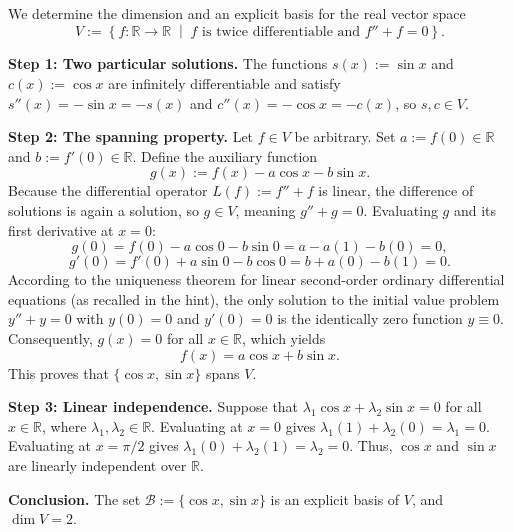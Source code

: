 \begin{exercisesolution*}
\label{sol:harmonic_ode_solution_space}
We determine the dimension and an explicit basis for the real vector space
\[
    V := \left\{ f \colon \mathbb{R} \to \mathbb{R} \;\middle|\; f \text{ is twice differentiable and } f'' + f = 0 \right\}.
\]

\textbf{Step 1: Two particular solutions.} The functions $s(x) := \sin x$ and $c(x) := \cos x$ are infinitely differentiable and satisfy $s''(x) = -\sin x = -s(x)$ and $c''(x) = -\cos x = -c(x)$, so $s, c \in V$.

\textbf{Step 2: The spanning property.} Let $f \in V$ be arbitrary. Set $a := f(0) \in \mathbb{R}$ and $b := f'(0) \in \mathbb{R}$. Define the auxiliary function
\[
    g(x) := f(x) - a \cos x - b \sin x.
\]
Because the differential operator $L(f) := f'' + f$ is linear, the difference of solutions is again a solution, so $g \in V$, meaning $g'' + g = 0$. Evaluating $g$ and its first derivative at $x = 0$:
\[
    g(0) = f(0) - a \cos 0 - b \sin 0 = a - a(1) - b(0) = 0,
\]
\[
    g'(0) = f'(0) + a \sin 0 - b \cos 0 = b + a(0) - b(1) = 0.
\]
According to the uniqueness theorem for linear second-order ordinary differential equations (as recalled in the hint), the only solution to the initial value problem $y'' + y = 0$ with $y(0) = 0$ and $y'(0) = 0$ is the identically zero function $y \equiv 0$.
Consequently, $g(x) = 0$ for all $x \in \mathbb{R}$, which yields
\[
    f(x) = a \cos x + b \sin x.
\]
This proves that $\{\cos x, \sin x\}$ spans $V$.

\textbf{Step 3: Linear independence.} Suppose that $\lambda_1 \cos x + \lambda_2 \sin x = 0$ for all $x \in \mathbb{R}$, where $\lambda_1, \lambda_2 \in \mathbb{R}$. Evaluating at $x = 0$ gives $\lambda_1(1) + \lambda_2(0) = \lambda_1 = 0$. Evaluating at $x = \pi/2$ gives $\lambda_1(0) + \lambda_2(1) = \lambda_2 = 0$. Thus, $\cos x$ and $\sin x$ are linearly independent over $\mathbb{R}$.

\textbf{Conclusion.} The set $\mathcal{B} := \{\cos x, \sin x\}$ is an explicit basis of $V$, and $\dim V = 2$.
\end{exercisesolution*}


